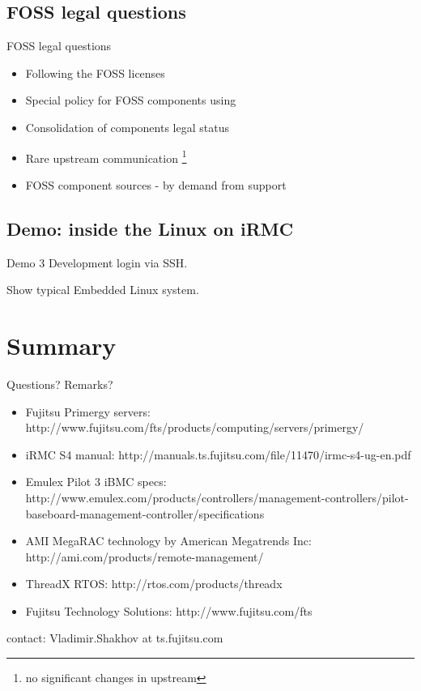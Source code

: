 \documentclass{beamer}
\begin{document}
  \subsection{FOSS legal questions}
  \begin{frame}{FOSS legal questions}
	  \begin{itemize}
		  \item Following the FOSS licenses
		  \item Special policy for FOSS components using
		  \item Consolidation of components legal status
		  \item Rare upstream communication \footnote{no significant changes in upstream}
		  \item FOSS component sources - by demand from support
	  \end{itemize}
  \end{frame}

  \subsection{Demo: inside the Linux on iRMC}
  \begin{frame}{Demo 3}
	 Development login via SSH.

	 Show typical Embedded Linux system.
  \end{frame}



\section*{Summary}
\begin{frame}{Questions? Remarks?}
  
  \begin{center}
  \end{center}

  \begin{itemize}
	  \item \tiny{Fujitsu Primergy servers: http://www.fujitsu.com/fts/products/computing/servers/primergy/ }
	  \item \tiny{iRMC S4 manual: http://manuals.ts.fujitsu.com/file/11470/irmc-s4-ug-en.pdf}
	  \item \tiny{Emulex Pilot 3 iBMC specs: http://www.emulex.com/products/controllers/management-controllers/pilot-baseboard-management-controller/specifications}
	  \item \tiny{AMI MegaRAC technology by American Megatrends Inc: http://ami.com/products/remote-management/}
	  \item \tiny{ThreadX RTOS: http://rtos.com/products/threadx }
	  \item \tiny{Fujitsu Technology Solutions: http://www.fujitsu.com/fts}
	\end{itemize}

  contact: Vladimir.Shakhov at ts.fujitsu.com


\end{frame}
\end{document}
